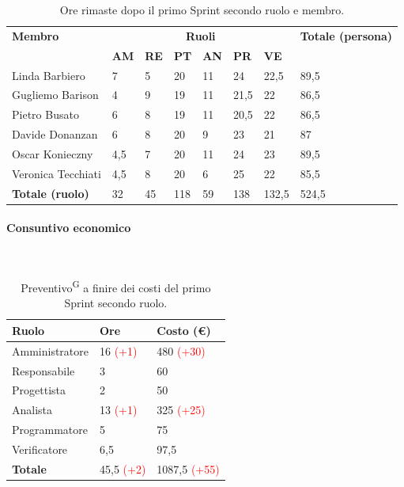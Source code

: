 \documentclass[8pt]{article}
\newcommand{\glossterm}[1]{#1\textsuperscript{G}} %
\newcommand{\subsubsubsection}[1]{\paragraph{#1}\mbox{}\\}
\begin{document}
\begin{table}[ht!]
	\centering
	\begin{tabular}{p{4cm} p{1cm} p{1cm} p{1cm} p{1cm} p{1cm} p{1cm} p{3cm}}
		\toprule
        \textbf{Membro} & \multicolumn{6}{c}{\textbf{Ruoli}} & \textbf{Totale (persona)}\\
		& \textbf{AM} & \textbf{RE} & \textbf{PT} & \textbf{AN} & \textbf{PR} & \textbf{VE}\\
		\midrule
        Linda Barbiero & 7 & 5 & 20 & 11 & 24 & 22,5 & 89,5 \\ 
        Gugliemo Barison & 4 & 9 & 19 & 11 & 21,5 & 22 & 86,5 \\ 
        Pietro Busato & 6 & 8 & 19 & 11 & 20,5 & 22 & 86,5 \\ 
        Davide Donanzan & 6 & 8 & 20 & 9 & 23 & 21 & 87 \\ 
        Oscar Konieczny & 4,5 & 7 & 20 & 11 & 24 & 23 & 89,5 \\ 
        Veronica Tecchiati & 4,5 & 8 & 20 & 6 & 25 & 22 & 85,5 \\ 
        \midrule
        \textbf{Totale (ruolo)} & 32 & 45 & 118 & 59 & 138 & 132,5 & 524,5 \\ 
        \bottomrule
    \end{tabular}
	\caption{Ore rimaste dopo il primo Sprint secondo ruolo e membro.}
	\label{table:Ore rimaste dopo il primo Sprint secondo ruolo e membro}
\end{table}
\subsubsubsection{Consuntivo economico}
\begin{table}[ht!]
	\centering
	\begin{tabular}{p{4cm} p{3cm} p{4cm}}
        \toprule
        \textbf{Ruolo} & \textbf{Ore} & \textbf{Costo (€)} \\
        \midrule
        Amministratore & 16 \textcolor{red}{(+1)} & 480 \textcolor{red}{(+30)} \\ 
        Responsabile & 3 & 60 \\ 
        Progettista & 2 & 50 \\ 
        Analista & 13 \textcolor{red}{(+1)} & 325 \textcolor{red}{(+25)} \\ 
        Programmatore & 5 & 75 \\ 
        Verificatore & 6,5 & 97,5 \\
        \midrule
        \textbf{Totale} & 45,5 \textcolor{red}{(+2)} & 1087,5 \textcolor{red}{(+55)} \\ 
    \bottomrule
    \end{tabular}
    \caption{\glossterm{Preventivo} a finire dei costi del primo Sprint secondo ruolo.}
	\label{table:Preventivo a finire dei costi del primo Sprint secondo ruolo}
\end{table}
\end{document}
